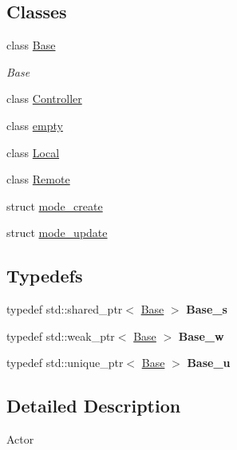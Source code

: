 \subsection*{\-Classes}
\begin{DoxyCompactItemize}
\item 
class \hyperlink{classNeb_1_1Actor_1_1Base}{\-Base}
\begin{DoxyCompactList}\small\item\em \-Base \end{DoxyCompactList}\item 
class \hyperlink{classNeb_1_1Actor_1_1Controller}{\-Controller}
\item 
class \hyperlink{classNeb_1_1Actor_1_1empty}{empty}
\item 
class \hyperlink{classNeb_1_1Actor_1_1Local}{\-Local}
\item 
class \hyperlink{classNeb_1_1Actor_1_1Remote}{\-Remote}
\item 
struct \hyperlink{structNeb_1_1Actor_1_1mode__create}{mode\-\_\-create}
\item 
struct \hyperlink{structNeb_1_1Actor_1_1mode__update}{mode\-\_\-update}
\end{DoxyCompactItemize}
\subsection*{\-Typedefs}
\begin{DoxyCompactItemize}
\item 
\hypertarget{namespaceNeb_1_1Actor_a8f702ef70e4e45d7cb06e9e4e7382e85}{typedef std\-::shared\-\_\-ptr$<$ \hyperlink{classNeb_1_1Actor_1_1Base}{\-Base} $>$ {\bfseries \-Base\-\_\-s}}\label{namespaceNeb_1_1Actor_a8f702ef70e4e45d7cb06e9e4e7382e85}

\item 
\hypertarget{namespaceNeb_1_1Actor_afaf94cd97cc0a89949bc901866541de6}{typedef std\-::weak\-\_\-ptr$<$ \hyperlink{classNeb_1_1Actor_1_1Base}{\-Base} $>$ {\bfseries \-Base\-\_\-w}}\label{namespaceNeb_1_1Actor_afaf94cd97cc0a89949bc901866541de6}

\item 
\hypertarget{namespaceNeb_1_1Actor_a312611dc04f46dfc82e4e1b21cdb4c6d}{typedef std\-::unique\-\_\-ptr$<$ \hyperlink{classNeb_1_1Actor_1_1Base}{\-Base} $>$ {\bfseries \-Base\-\_\-u}}\label{namespaceNeb_1_1Actor_a312611dc04f46dfc82e4e1b21cdb4c6d}

\end{DoxyCompactItemize}


\subsection{\-Detailed \-Description}
\-Actor 